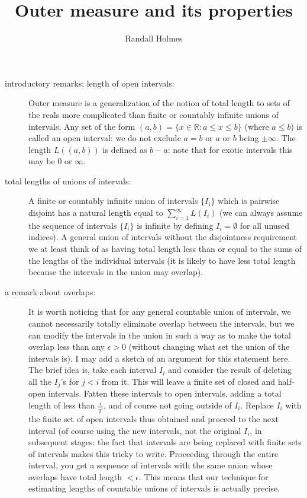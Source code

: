 \documentclass[12pt]{article}
\title{Outer measure and its properties}
\author{Randall Holmes}
\begin{document}
\maketitle

\begin{description}

\item[introductory remarks; length of open intervals:]  Outer measure is a generalization of the notion of total length to sets of the reals more complicated than finite or countably infinite unions of intervals.  Any set of the form $(a,b) = \{x\in \mathbb R:a \leq x \leq b\}$ (where $a \leq b$)  is called an open interval:  we do not exclude
$a=b$ or $a$ or $b$ being $\pm \infty$.  The length $L((a,b))$ is defined as $b-a$:  note that for exotic intervals this may be 0 or $\infty$.

\item[total lengths of unions of intervals:]  A finite or countably infinite union of intervals $\{I_i\}$ which is pairwise disjoint has a natural length equal to $\sum_{i=1}^{\infty} L(I_i)$ (we can always assume the sequence of intervals $\{I_i\}$ is infinite by
defining $I_i= \emptyset$ for all unused indices).  A general union of intervals without the disjointness requirement we at least think of as having total length less than or equal to the sums of the lengths of the individual intervals (it is likely to have less total length because the intervals in the union may overlap).

\item[a remark about overlaps:]  It is worth noticing that for any general countable union of intervals, we cannot necessarily totally eliminate overlap between the intervals, but we can  modify the intervals in the union  in such a way as to make the total overlap less than any $\epsilon>0$ (without changing what set the union of the intervals is).  I may add a sketch of an argument for this statement here.
The brief idea is, take each interval $I_i$ and consider the result of deleting all the $I_j$'s for $j<i$ from it.  This will leave a finite set of closed and half-open intervals.  Fatten these intervals
to open intervals, adding a total length of less than $\frac\epsilon{2^i}$, and of course not going outside of $I_i$.  Replace $I_i$ with the finite set of open intervals thus obtained
and proceed to the next interval (of course using the new intervals, not the original $I_i$, in subsequent stages:  the fact that intervals are being replaced with finite sets of intervals
makes this tricky to write.  Proceeding through the entire interval, you get a sequence of intervals with the same union whose overlaps have total length $<\epsilon$.   This means
that our technique for estimating lengths of countable unions of intervals is actually precise.


\end{description}
\end{document}

